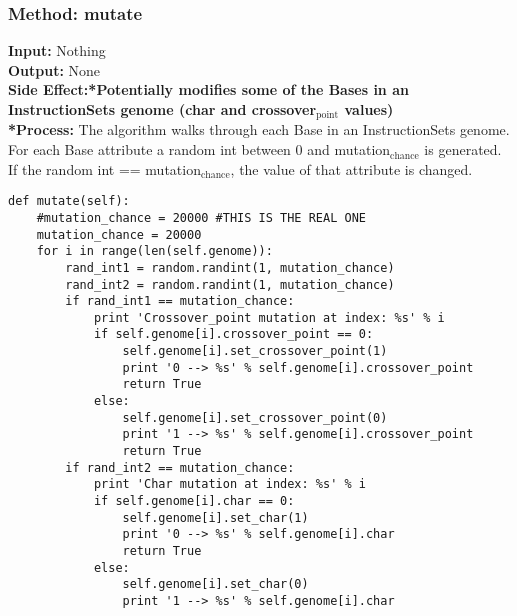 \documentclass[a4paper]{article}
\begin{document}
\subsubsection{Method: mutate}
\label{sec-6-3-2}
\textbf{Input:} Nothing\\
\textbf{Output:} None\\
\textbf{Side Effect:*Potentially modifies some of the Bases in an InstructionSets genome (char and crossover$_{\text{point}}$ values)\\
*Process:} The algorithm walks through each Base in an InstructionSets genome. For each Base attribute a random int between 0 and mutation$_{\text{chance}}$ is generated. If the random int ==  mutation$_{\text{chance}}$, the value of that attribute is changed.\\
\begin{verbatim}
def mutate(self):
    #mutation_chance = 20000 #THIS IS THE REAL ONE
    mutation_chance = 20000
    for i in range(len(self.genome)):
        rand_int1 = random.randint(1, mutation_chance)
        rand_int2 = random.randint(1, mutation_chance)
        if rand_int1 == mutation_chance:
            print 'Crossover_point mutation at index: %s' % i
            if self.genome[i].crossover_point == 0:
                self.genome[i].set_crossover_point(1)
                print '0 --> %s' % self.genome[i].crossover_point
                return True
            else:
                self.genome[i].set_crossover_point(0)
                print '1 --> %s' % self.genome[i].crossover_point
                return True
        if rand_int2 == mutation_chance:
            print 'Char mutation at index: %s' % i
            if self.genome[i].char == 0:
                self.genome[i].set_char(1)
                print '0 --> %s' % self.genome[i].char
                return True
            else:
                self.genome[i].set_char(0) 
                print '1 --> %s' % self.genome[i].char
\end{verbatim}
\end{document}
